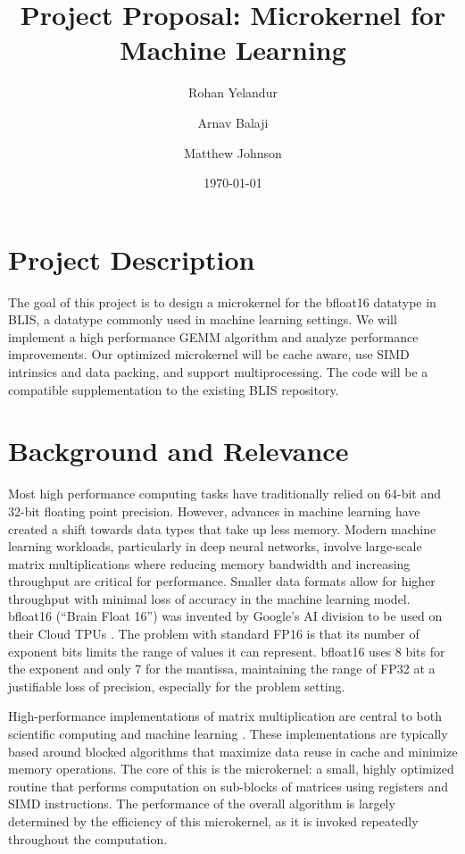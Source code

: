 \documentclass[11pt]{article}
\title{Project Proposal: Microkernel for Machine Learning}
\author{Rohan Yelandur}
\author{Arnav Balaji}
\author{Matthew Johnson}
\affil{Kernel Sanders (14)}
\date{\today}
\begin{document}
\maketitle

\section{Project Description}

The goal of this project is to design a microkernel for the bfloat16 datatype in BLIS, a datatype commonly used in machine learning settings. We will implement a high performance GEMM algorithm and analyze performance improvements. Our optimized microkernel will be cache aware, use SIMD intrinsics and data packing, and support multiprocessing. The code will be a compatible supplementation to the existing BLIS repository.

\section{Background and Relevance}

Most high performance computing tasks have traditionally relied on 64-bit and 32-bit floating point precision. However, advances in machine learning have created a shift towards data types that take up less memory. Modern machine learning workloads, particularly in deep neural networks, involve large-scale matrix multiplications where reducing memory bandwidth and increasing throughput are critical for performance. Smaller data formats allow for higher throughput with minimal loss of accuracy in the machine learning model. bfloat16 (“Brain Float 16”) was invented by Google’s AI division to be used on their Cloud TPUs \cite{kanwar2019bfloat16}. The problem with standard FP16 is that its number of exponent bits limits the range of values it can represent. bfloat16 uses 8 bits for the exponent and only 7 for the mantissa, maintaining the range of FP32 at a justifiable loss of precision, especially for the problem setting.

High-performance implementations of matrix multiplication are central to both scientific computing and machine learning \cite{Goto2008AnatomyOH}. These implementations are typically based around blocked algorithms that maximize data reuse in cache and minimize memory operations. The core of this is the microkernel: a small, highly optimized routine that performs computation on sub-blocks of matrices using registers and SIMD instructions. The performance of the overall algorithm is largely determined by the efficiency of this microkernel, as it is invoked repeatedly throughout the computation.
\end{document}
